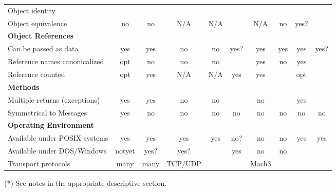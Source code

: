 {\begin{table}[htbp]
\begin{center}
\begin{tabular}[c]{|l|c|c|c|c|c|c|c|c|c|}
\hline
Object identity
			& 	&	&	&	&	&	&	&	&	\\
Object equivalence
			& no	& no	& N/A	& N/A	& \q	& N/A	& no	& yes?	& \q	\\
\hline
\hline
\multicolumn{10}{|l|}{\bf Object References} \\
\hline
Can be passed as data
			& yes	& yes	& no	& no	& yes?	& yes	& yes	& yes	& yes?	\\
Reference names canonicalized
			& opt	& no	& no	& no	& \q	& yes	& no	& yes	& \q	\\
Reference counted
			& opt	& yes	& N/A	& N/A	& yes	& yes	& \q	& opt	& \q	\\
\hline
\hline
\multicolumn{10}{|l|}{\bf Methods} \\
\hline
Multiple returns (exceptions)
			& yes	& yes	& no	& no	& \q	& no	& \q	& yes	& \q	\\
Symmetrical to Messages
			& yes	& no	& no	& no	& no	& no	& no	& no	& no	\\
\hline
\hline
\multicolumn{10}{|l|}{\bf Operating Environment} \\
\hline
Available under POSIX systems
			& yes	& yes	& yes	& yes	& no?	& no	& no	& yes	& yes	\\
Available under DOS/Windows
			& notyet& yes?	& yes?	& \q	& yes	& no	& no	& \q	& \q	\\
Transport protocols
			& many	& many	&TCP/UDP& \q	& \q	& Mach3	& \q	& \q	& \q	\\
\hline
\end{tabular}
\end{center}
(*) See notes in the appropriate descriptive section.
\label{table-om-comparisons}
\end{table}
}




